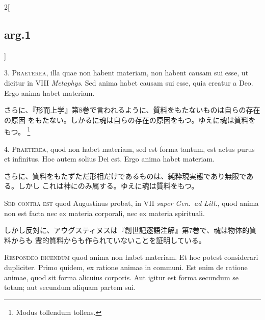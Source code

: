 \documentclass[paper=a4paper,fontsize=10pt,jafontsize=9pt,titlepage]{jlreq}
\begin{document}
\begin{paracol}{2}[\subsection{arg.1}]

3. {\scshape Praeterea}, illa quae non habent materiam, non habent causam sui
esse, ut dicitur in VIII {\itshape Metaphys}. Sed anima habet causam sui esse,
quia creatur a Deo. Ergo anima habet materiam.

\switchcolumn

さらに、『形而上学』第8巻で言われるように、質料をもたないものは自らの存在の原因
をもたない。しかるに魂は自らの存在の原因をもつ。ゆえに魂は質料をもつ。
\footnote{Modus tollendum tollens.}


4. {\scshape Praeterea}, quod non habet materiam, sed est forma tantum, est
actus purus et infinitus. Hoc autem solius Dei est. Ergo anima habet materiam.

\switchcolumn

さらに、質料をもたずただ形相だけであるものは、純粋現実態であり無限である。しかし
これは神にのみ属する。ゆえに魂は質料をもつ。

\switchcolumn*[\subsection{s.c.}]

{\scshape Sed contra est} quod Augustinus probat, in VII {\itshape super Gen.~ad
Litt}., quod anima non est facta nec ex materia corporali, nec ex materia
spirituali.

\switchcolumn

しかし反対に、アウグスティヌスは『創世記逐語注解』第7巻で、魂は物体的質料からも
霊的質料からも作られていないことを証明している。


{\scshape Respondeo dicendum} quod anima non habet materiam. Et hoc potest
considerari dupliciter. Primo quidem, ex ratione animae in communi. Est enim de
ratione animae, quod sit forma alicuius corporis. Aut igitur est forma secundum
se totam; aut secundum aliquam partem sui.


\end{paracol}
\end{document}
